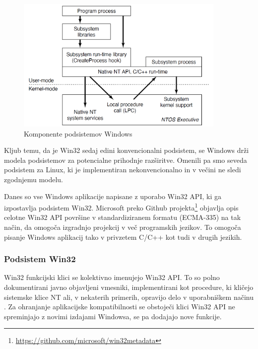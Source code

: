 \documentclass[a4paper,12pt,openright]{book}
\begin{document}
\begin{figure}[h!]
	\begin{center}
		\includegraphics[width=0.9\textwidth]{images/windows_subsystems_components.png}
	\end{center}
	\caption{Komponente podsistemov Windows \cite{Tanenbaum_Bos_2023}}
	\label{fig:windows_subsystems_components}
\end{figure}

Kljub temu, da je Win32 sedaj edini konvencionalni podsistem, se Windows drži modela podsistemov za potencialne prihodnje razširitve.
Omenili pa smo seveda podsistem za Linux, ki je implementiran nekonvencionalno in v večini ne sledi zgodnjemu modelu.

Danes so vse Windows aplikacije napisane z uporabo Win32 API, ki ga izpostavlja podsistem Win32.
Microsoft preko Github projekta\footnote{\url{https://github.com/microsoft/win32metadata}} objavlja opis celotne Win32 API površine v standardiziranem formatu (ECMA-335) na tak način, da omogoča izgradnjo projekcij v več programskih jezikov.
To omogoča pisanje Windows aplikacij tako v privzetem C/C++ kot tudi v drugih jezikih.

\subsubsection{Podsistem Win32}

Win32 funkcijski klici se kolektivno imenujejo Win32 API.
To so polno dokumentirani javno objavljeni vmesniki, implementirani kot procedure, ki kličejo sistemske klice NT ali, v nekaterih primerih, opravijo delo v uporabniškem načinu \cite{Tanenbaum_Bos_2023}.
Za ohranjanje aplikacijske kompatibilnosti se obstoječi klici Win32 API ne spreminjajo z novimi izdajami Windowsa, se pa dodajajo nove funkcije.
\end{document}
